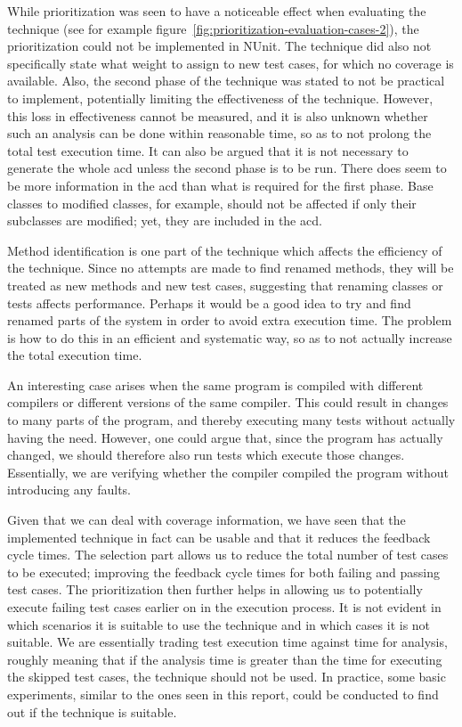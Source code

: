 \documentclass[a4paper,english,12pt]{report}
\begin{document}
While prioritization was seen to have a noticeable effect when evaluating the technique (see for example figure~\vref{fig:prioritization-evaluation-cases-2}), the prioritization could not be implemented in NUnit. The technique did also not specifically state what weight to assign to new test cases, for which no coverage is available. Also, the second phase of the technique was stated to not be practical to implement, potentially limiting the effectiveness of the technique. However, this loss in effectiveness cannot be measured, and it is also unknown whether such an analysis can be done within reasonable time, so as to not prolong the total test execution time. It can also be argued that it is not necessary to generate the whole \gls{acd} unless the second phase is to be run. There does seem to be more information in the \gls{acd} than what is required for the first phase. Base classes to modified classes, for example, should not be affected if only their subclasses are modified; yet, they are included in the \gls{acd}.

Method identification is one part of the technique which affects the efficiency of the technique. Since no attempts are made to find renamed methods, they will be treated as new methods and new test cases, suggesting that renaming classes or tests affects performance. Perhaps it would be a good idea to try and find renamed parts of the system in order to avoid extra execution time. The problem is how to do this in an efficient and systematic way, so as to not actually increase the total execution time. 

An interesting case arises when the same program is compiled with different compilers or different versions of the same compiler. This could result in changes to many parts of the program, and thereby executing many tests without actually having the need. However, one could argue that, since the program has actually changed, we should therefore also run tests which execute those changes. Essentially, we are verifying whether the compiler compiled the program without introducing any faults.

Given that we can deal with coverage information, we have seen that the implemented technique in fact can be usable and that it reduces the feedback cycle times. The selection part allows us to reduce the total number of test cases to be executed; improving the feedback cycle times for both failing and passing test cases. The prioritization then further helps in allowing us to potentially execute failing test cases earlier on in the execution process. It is not evident in which scenarios it is suitable to use the technique and in which cases it is not suitable. We are essentially trading test execution time against time for analysis, roughly meaning that if the analysis time is greater than the time for executing the skipped test cases, the technique should not be used. In practice, some basic experiments, similar to the ones seen in this report, could be conducted to find out if the technique is suitable.
\end{document}
